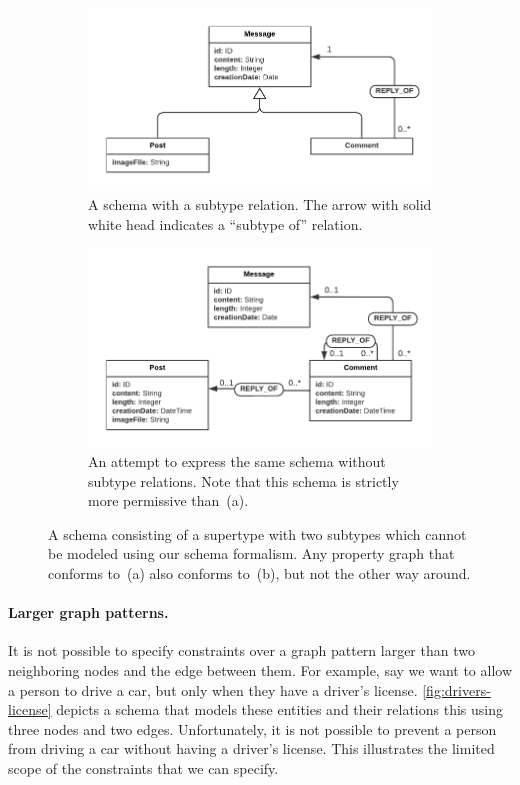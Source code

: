 \documentclass{report}
\theoremstyle{definition}
\begin{document}
\begin{figure}[t]
  \centering
  \begin{subfigure}[t]{0.45\textwidth}
    \centering
    \includegraphics[width=\textwidth]{figures/subtyping.pdf}
    \caption{A schema with a subtype relation. The arrow with solid white head indicates a ``subtype of'' relation.}
    \label{fig:subtyping}
  \end{subfigure}
  \hfill
  \begin{subfigure}[t]{0.45\textwidth}
    \centering
    \includegraphics[width=\textwidth]{figures/subtyping-ours.pdf}
    \caption{An attempt to express the same schema without subtype relations. Note that this schema is strictly more permissive than~(a).}
    \label{fig:subtyping-ours}
  \end{subfigure}
  \caption{A schema consisting of a supertype with two subtypes which cannot be modeled using our schema formalism. Any property graph that conforms to~(a) also conforms to~(b), but not the other way around.}
\end{figure}

\paragraph{Larger graph patterns.} It is not possible to specify constraints over a graph pattern larger than two neighboring nodes and the edge between them. For example, say we want to allow a person to drive a car, but only when they have a driver's license. \autoref{fig:drivers-license} depicts a schema that models these entities and their relations this using three nodes and two edges. Unfortunately, it is not possible to prevent a person from driving a car without having a driver's license. This illustrates the limited scope of the constraints that we can specify.
\end{document}
